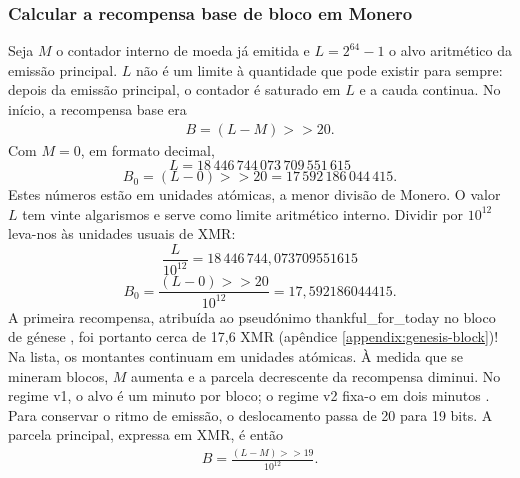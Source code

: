 \subsubsection*{Calcular a recompensa base de bloco em Monero}

Seja $M$ o contador interno de moeda já emitida e
$L=2^{64}-1$ o alvo aritmético da emissão principal. $L$ não é um limite à
quantidade que pode existir para sempre: depois da emissão principal, o
contador é saturado em $L$ e a cauda continua.
No início, a recompensa base era
\begin{align*}
B=(L-M)\mathbin{>>}20.
\end{align*}
Com $M=0$, em formato decimal,\vspace{.175cm}
\[L=18\,446\,744\,073\,709\,551\,615\]
\[B_0=(L-0)\mathbin{>>}20=17\,592\,186\,044\,415.\]
Estes números estão em unidades atómicas, a menor divisão de Monero.
O valor \(L\) tem vinte algarismos e serve como limite aritmético interno.
Dividir por $10^{12}$ leva-nos às unidades usuais de XMR:
\[\frac{L}{10^{12}}=18\,446\,744{,}073709551615\]
\[B_0=\frac{(L-0)\mathbin{>>}20}{10^{12}}=17{,}592186044415.\]
A primeira recompensa, atribuída ao pseudónimo thankful\_for\_today no bloco
de génese \cite{bitmonero-launched}, foi portanto cerca de 17,6 XMR
(apêndice \ref{appendix:genesis-block})! Na lista, os montantes continuam em
unidades atómicas.
%
À medida que se mineram blocos, $M$ aumenta e a parcela decrescente da
recompensa diminui. No regime v1, o alvo é um minuto por bloco; o regime v2
fixa-o em dois minutos \cite{monero-0.9.3}. Para conservar o ritmo de emissão,
o deslocamento passa de 20 para 19 bits.
A parcela principal, expressa em XMR, é então
\begin{align*}
B=\frac{(L-M)\mathbin{>>}19}{10^{12}}.
\end{align*}


